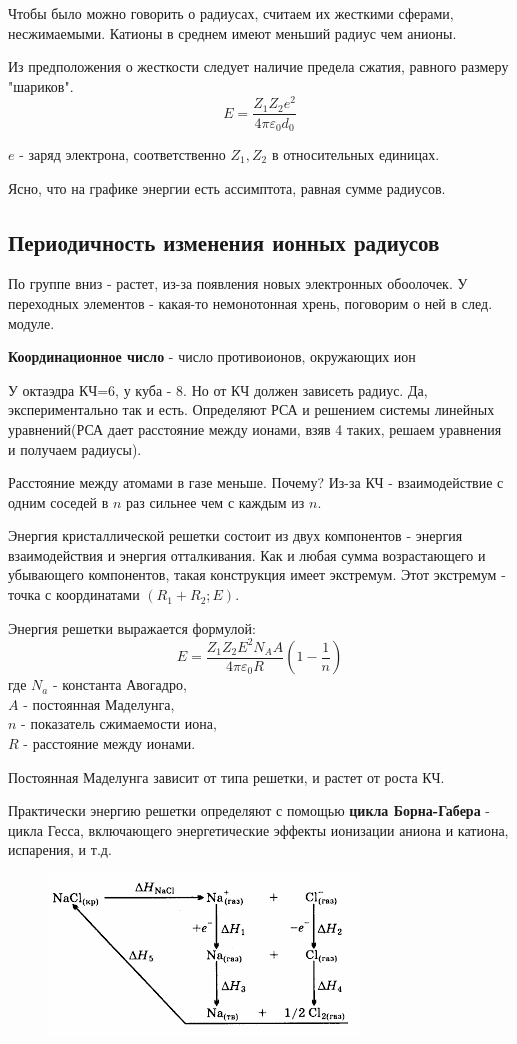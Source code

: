 \documentclass[11pt]{article}
\begin{document}
Чтобы было можно говорить о радиусах, считаем их жесткими сферами, несжимаемыми. Катионы в среднем имеют меньший радиус чем анионы.

Из предположения о жесткости следует наличие предела сжатия, равного размеру "шариков".
$$E = \frac{Z_1Z_2e^2}{4\pi\varepsilon_0d_0}$$

$e$ - заряд электрона, соответственно $Z_1, Z_2$ в относительных единицах.

Ясно, что на графике энергии есть ассимптота, равная сумме радиусов.

\subsection*{Периодичность изменения ионных радиусов}

По группе вниз - растет, из-за появления новых электронных обоолочек. У переходных элементов - какая-то немонотонная хрень, поговорим о ней в след. модуле.

\textbf{Координационное число} - число противоионов, окружающих ион

У октаэдра КЧ=6, у куба - 8. Но от КЧ должен зависеть радиус. Да, экспериментально так и есть. Определяют РСА и решением системы линейных уравнений(РСА дает расстояние между ионами, взяв 4 таких, решаем уравнения и получаем радиусы).

Расстояние между атомами в газе меньше. Почему? Из-за КЧ - взаимодействие с одним соседей в $n$ раз сильнее чем с каждым из $n$.

Энергия кристаллической решетки состоит из двух компонентов - энергия взаимодействия и энергия отталкивания. Как и любая сумма возрастающего и убывающего компонентов, такая конструкция имеет экстремум. Этот экстремум - точка с координатами $(R_1+R_2;E)$.

Энергия решетки выражается формулой:
$$E = \frac{Z_1Z_2E^2N_AA}{4\pi \varepsilon_0R}(1-\frac 1n) $$
где $N_a$ - константа Авогадро,\\
$A$ - постоянная Маделунга,\\
$n$ - показатель сжимаемости иона,\\
$R$ - расстояние между ионами.

Постоянная Маделунга зависит от типа решетки, и растет от роста КЧ.

Практически энергию решетки определяют с помощью \textbf{цикла Борна-Габера} - цикла Гесса, включающего энергетические эффекты ионизации аниона и катиона, испарения, и т.д.
\begin{figure}[htp]
\centering
\includegraphics[scale=1.00]{born-gaber.png}
\caption{}
\label{}
\end{figure}
\end{document}
